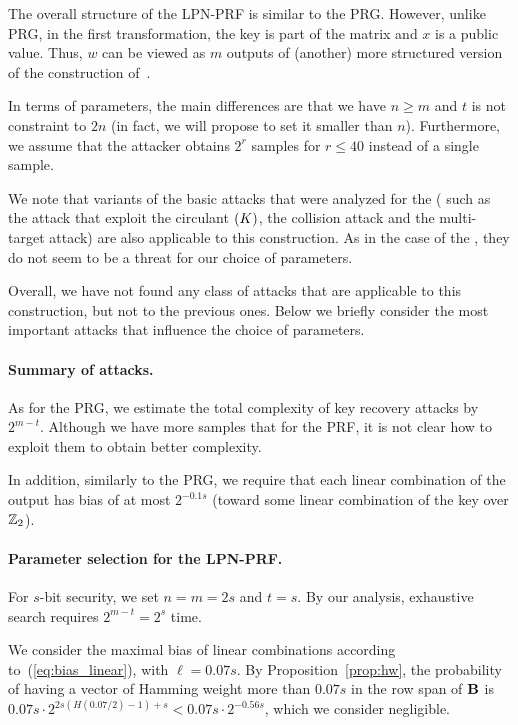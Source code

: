 The overall structure of the LPN-PRF is similar to the PRG.
However, unlike PRG, in the first transformation, the key is part of the matrix and
$x$ is a public value.
Thus, $w$ can be viewed as $m$ outputs of (another) more
structured version of the construction of~\cite{boneh2018-darkmatter}.

In terms of parameters, the main differences are that we have $n \geq m$
and $t$ is not constraint to $2n$ (in fact, we will propose to set it smaller than $n$).
Furthermore, we assume that the attacker obtains $2^r$ samples for $r \leq 40$ instead of a single sample.

We note that variants of the basic attacks that were analyzed for the \ttwPRF (
such as the attack that exploit the circulant $\mat(K)$, the collision attack
and the multi-target attack) are also applicable to this construction.
As in the case of the \ttwPRF,
they do not seem to be a threat for our choice of parameters.

Overall, we have not found any class of attacks that are
applicable to this construction, but not to the previous ones.
Below we briefly consider the most important attacks that influence the
choice of parameters.

\paragraph{Summary of attacks.}
As for the PRG, we estimate the total complexity of key recovery attacks by $2^{m - t}$.
Although we have more samples that for the PRF,
it is not clear how to exploit them to obtain better complexity.

In addition, similarly to the PRG,
we require that each linear combination of the output
has bias of at most $2^{-0.1 s}$
(toward some linear combination of the key over $\mathbb{Z}_2$).

\paragraph{Parameter selection for the LPN-PRF.}
For $s$-bit security, we set $n=m= 2s$ and $t =s$.
By our analysis, exhaustive search requires $2^{m - t} = 2^s$ time.

We consider the maximal bias of linear combinations according to~(\ref{eq:bias_linear}),
with $\ell = 0.07 s$.
By Proposition~\ref{prop:hw},
the probability of having a vector of Hamming weight more than $0.07 s$
in the row span of $\mat{B}$ is
$0.07 s \cdot 2^{2s (H(0.07/2) - 1) + s} < 0.07 s \cdot 2^{-0.56 s}$,
which we consider negligible.


